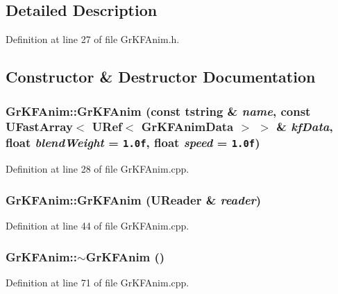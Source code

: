\subsection{Detailed Description}


Definition at line 27 of file GrKFAnim.h.

\subsection{Constructor \& Destructor Documentation}
\hypertarget{class_gr_k_f_anim_cfb1ff66e711a5047085b9faf152f681}{
\subsubsection[{GrKFAnim}]{\setlength{\rightskip}{0pt plus 5cm}GrKFAnim::GrKFAnim (const {\bf tstring} \& {\em name}, \/  const {\bf UFastArray}$<$ {\bf URef}$<$ {\bf GrKFAnimData} $>$ $>$ \& {\em kfData}, \/  float {\em blendWeight} = {\tt 1.0f}, \/  float {\em speed} = {\tt 1.0f})}}
\label{class_gr_k_f_anim_cfb1ff66e711a5047085b9faf152f681}




Definition at line 28 of file GrKFAnim.cpp.\hypertarget{class_gr_k_f_anim_bcd2ef342c645de6251bcc3644290e1d}{
\subsubsection[{GrKFAnim}]{\setlength{\rightskip}{0pt plus 5cm}GrKFAnim::GrKFAnim ({\bf UReader} \& {\em reader})}}
\label{class_gr_k_f_anim_bcd2ef342c645de6251bcc3644290e1d}




Definition at line 44 of file GrKFAnim.cpp.\hypertarget{class_gr_k_f_anim_1ed2fbe268f028e23976632df59e83e2}{
\subsubsection[{$\sim$GrKFAnim}]{\setlength{\rightskip}{0pt plus 5cm}GrKFAnim::$\sim$GrKFAnim ()}}
\label{class_gr_k_f_anim_1ed2fbe268f028e23976632df59e83e2}




Definition at line 71 of file GrKFAnim.cpp.

